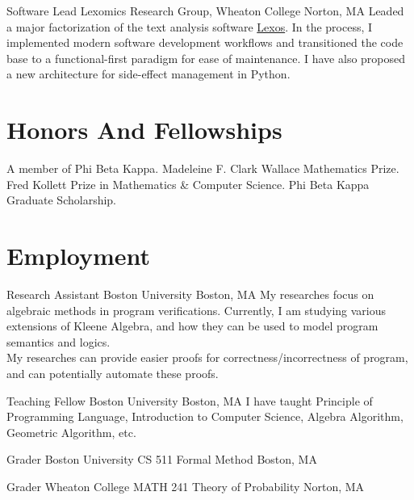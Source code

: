 \documentclass[11pt,roman]{moderncv}        %
\begin{document}
{Software Lead}
{Lexomics Research Group, Wheaton College}
{Norton, MA}{}
{
  Leaded a major factorization of the text analysis software 
  \href{https://github.com/WheatonCS/Lexos}{Lexos}.
  In the process, I implemented modern software development workflows and
  transitioned the code base to a functional-first paradigm for ease of maintenance.
  I have also proposed a new architecture for side-effect management in Python.
}


\section{Honors And Fellowships}
 {A member of Phi Beta Kappa.}
 {
  Madeleine F. Clark Wallace Mathematics Prize. \newline
  Fred Kollett Prize in Mathematics \& Computer Science. \newline
  Phi Beta Kappa Graduate Scholarship.
}



\section{Employment}

{Research Assistant}
{Boston University}
{Boston, MA}{}
{My researches focus on algebraic methods in program verifications.
Currently, I am studying various extensions of Kleene Algebra, 
and how they can be used to model program semantics and logics.\\
My researches can provide easier proofs for correctness/incorrectness of program,
and can potentially automate these proofs.
}

{Teaching Fellow}
{Boston University}
{Boston, MA}{}
{
  I have taught Principle of Programming Language, Introduction to Computer Science,
  Algebra Algorithm, Geometric Algorithm, etc.
}

{Grader}
{Boston University CS 511 Formal Method}
{Boston, MA}{}{}

{Grader}
{Wheaton College MATH 241 Theory of Probability}
{Norton, MA}{}{}
\end{document}
